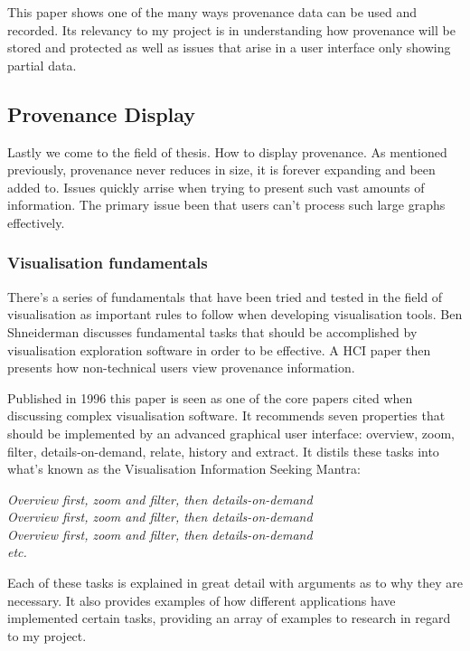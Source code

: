 This paper shows one of the many ways provenance data can be used and recorded. Its relevancy to my project is in understanding how provenance will be stored and protected as well as issues that arise in a user interface only showing partial data.

\subsection{Provenance Display}
\label{sec:provenance_display}

Lastly we come to the field of thesis. How to display provenance. As mentioned previously, provenance never reduces in size, it is forever expanding and been added to. Issues quickly arrise when trying to present such vast amounts of information. The primary issue been that users can't process such large graphs effectively.

\subsubsection{Visualisation fundamentals}
\label{sub:visualisation_fundamentals}

There's a series of fundamentals that have been tried and tested in the field of visualisation as important rules to follow when developing visualisation tools. Ben Shneiderman discusses fundamental tasks that should be accomplished by visualisation exploration software in order to be effective. A HCI paper then presents how non-technical users view provenance information.


Published in 1996 this paper is seen as one of the core papers cited when discussing complex visualisation software. It recommends seven properties that should be implemented by an advanced graphical user interface: overview, zoom, filter, details-on-demand, relate, history and extract. It distils these tasks into what's known as the Visualisation Information Seeking Mantra:

\textit{Overview first, zoom and filter, then details-on-demand}\\
\textit{Overview first, zoom and filter, then details-on-demand}\\
\textit{Overview first, zoom and filter, then details-on-demand}\\
\textit{etc.}

Each of these tasks is explained in great detail with arguments as to why they are necessary. It also provides examples of how different applications have implemented certain tasks, providing an array of examples to research in regard to my project.


